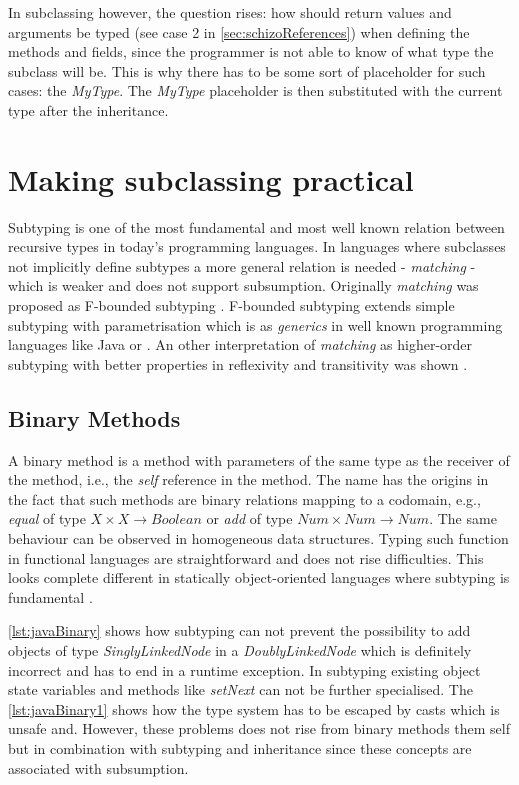 In subclassing however, the question rises: how should return values
and arguments be typed (see case 2 in \ref{sec:schizoReferences})
when defining the methods and fields, since the programmer is not able
to know of what type the subclass will be. This is why there has to
be some sort of placeholder for such cases: the \emph{MyType}. The
\emph{MyType} placeholder is then substituted with the current type
after the inheritance.

\chapter{Making subclassing practical}
Subtyping is one of the most fundamental and most well known relation
between recursive types in today's programming languages. In languages
where subclasses not implicitly define subtypes a more general
relation is needed - \emph{matching} - which is weaker and does
not support subsumption. Originally \emph{matching} was proposed
as F-bounded subtyping \cite{canning_f-bounded_1989}. F-bounded
subtyping extends simple subtyping with parametrisation which is as
\emph{generics} in well known programming languages like Java or \CS
\cite{barron-estrada_inheritance_2003}. An other interpretation of
\emph{matching} as higher-order subtyping with better properties in
reflexivity and transitivity was shown \cite{abadi_subtyping_1996}.

\section{Binary Methods}
A binary method is a method with parameters of the same type as the
receiver of the method, i.e., the \emph{self} reference in the method. The
name has the origins in the fact that such methods are binary relations
mapping to a codomain, e.g., \emph{equal} of type $X \times X \rightarrow
Boolean$ or \emph{add} of type $Num \times Num \rightarrow Num$. The
same behaviour can be observed in homogeneous data structures. Typing
such function in functional languages are straightforward and does not
rise difficulties. This looks complete different in statically object-oriented
languages where subtyping is fundamental \cite{bruce_binary_1995}.

\autoref{lst:javaBinary} shows how subtyping can not prevent the
possibility to add objects of type \emph{SinglyLinkedNode} in a
\emph{DoublyLinkedNode} which is definitely incorrect and has to end
in a runtime exception. In subtyping existing object state variables
and methods like \emph{setNext} can not be further specialised. The
\autoref{lst:javaBinary1} shows how the type system has to be escaped
by casts which is unsafe and.  However, these problems does not rise
from binary methods them self but in combination with subtyping and
inheritance since these concepts are associated with subsumption.

